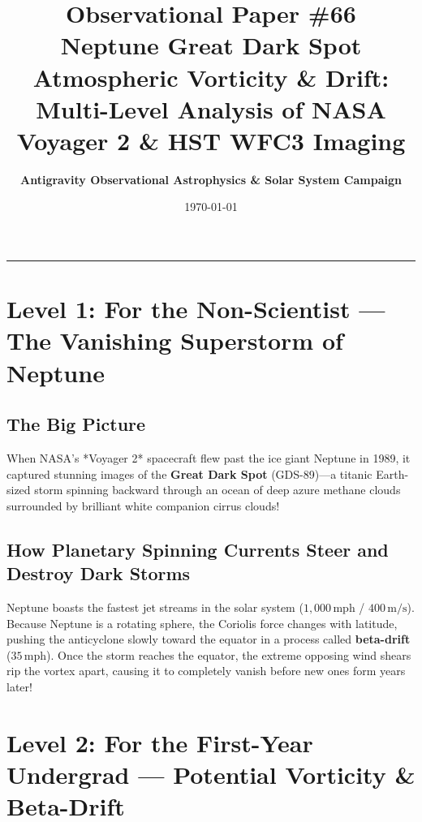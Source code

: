 \documentclass[11pt,a4paper]{article}
\title{\Huge \textbf{Observational Paper \#66}\\ \Large Neptune Great Dark Spot Atmospheric Vorticity \& Drift: Multi-Level Analysis of NASA Voyager 2 \& HST WFC3 Imaging}
\author{\textbf{Antigravity Observational Astrophysics \& Solar System Campaign}}
\date{\today}
\begin{document}
\maketitle

\vspace{-1em}
\begin{center}
\rule{\textwidth}{1.5pt}
\end{center}

\section*{Level 1: For the Non-Scientist — The Vanishing Superstorm of Neptune}

\subsection*{The Big Picture}
When NASA's *Voyager 2* spacecraft flew past the ice giant Neptune in 1989, it captured stunning images of the \textbf{Great Dark Spot} (GDS-89)—a titanic Earth-sized storm spinning backward through an ocean of deep azure methane clouds surrounded by brilliant white companion cirrus clouds!

\subsection*{How Planetary Spinning Currents Steer and Destroy Dark Storms}
Neptune boasts the fastest jet streams in the solar system ($1{,}000\,\text{mph}$ / $400\,\text{m/s}$). Because Neptune is a rotating sphere, the Coriolis force changes with latitude, pushing the anticyclone slowly toward the equator in a process called \textbf{beta-drift} ($35\,\text{mph}$). Once the storm reaches the equator, the extreme opposing wind shears rip the vortex apart, causing it to completely vanish before new ones form years later!

\newpage

\section*{Level 2: For the First-Year Undergrad — Potential Vorticity \& Beta-Drift}
\end{document}
